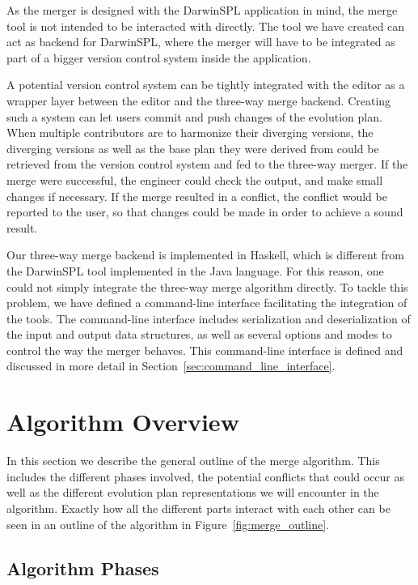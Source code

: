 \documentclass[a4paper,english]{ifimaster}
\begin{document}
As the merger is designed with the DarwinSPL application in mind, the merge tool is not intended to be interacted with directly. The tool we have created can act as backend for DarwinSPL, where the merger will have to be integrated as part of a bigger version control system inside the application.

A potential version control system can be tightly integrated with the editor as a wrapper layer between the editor and the three-way merge backend. Creating such a system can let users commit and push changes of the evolution plan. When multiple contributors are to harmonize their diverging versions, the diverging versions as well as the base plan they were derived from could be retrieved from the version control system and fed to the three-way merger. If the merge were successful, the engineer could check the output, and make small changes if necessary. If the merge resulted in a conflict, the conflict would be reported to the user, so that changes could be made in order to achieve a sound result.

Our three-way merge backend is implemented in Haskell, which is different from the DarwinSPL tool implemented in the Java language. For this reason, one could not simply integrate the three-way merge algorithm directly. To tackle this problem, we have defined a command-line interface facilitating the integration of the tools. The command-line interface includes serialization and deserialization of the input and output data structures, as well as several options and modes to control the way the merger behaves. This command-line interface is defined and discussed in more detail in Section~\vref{sec:command_line_interface}.

\section{Algorithm Overview}%
\label{sec:algorithm_overview}

In this section we describe the general outline of the merge algorithm. This includes the different phases involved, the potential conflicts that could occur as well as the different evolution plan representations we will encounter in the algorithm. Exactly how all the different parts interact with each other can be seen in an outline of the algorithm in Figure~\vref{fig:merge_outline}.

\subsection{Algorithm Phases}%
\label{sub:algorithm_phases}
\end{document}
